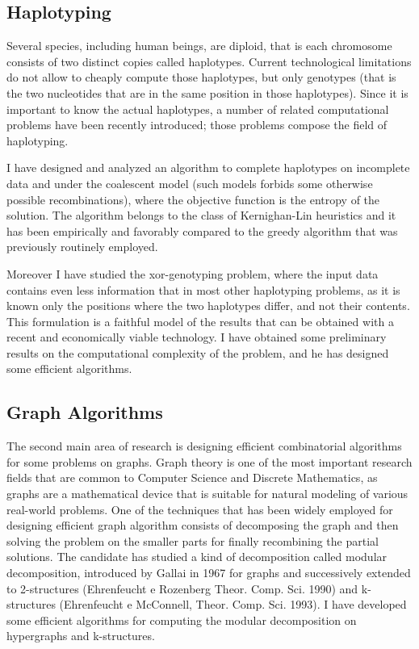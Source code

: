 \documentclass[11pt,a4paper,roman]{moderncv}
\begin{document}
\subsection{Haplotyping}\label{haplotyping}

Several species, including human beings, are diploid, that is each
chromosome consists of two distinct copies called haplotypes. Current
technological limitations do not allow to cheaply compute those
haplotypes, but only genotypes (that is the two nucleotides that are in
the same position in those haplotypes). Since it is important to know
the actual haplotypes, a number of related computational problems have
been recently introduced; those problems compose the field of
haplotyping.

I have designed and analyzed an algorithm to complete haplotypes on
incomplete data and under the coalescent model (such models forbids some
otherwise possible recombinations), where the objective function is the
entropy of the solution. The algorithm belongs to the class of
Kernighan-Lin heuristics and it has been empirically and favorably
compared to the greedy algorithm that was previously routinely employed.

Moreover I have studied the xor-genotyping problem, where the input data
contains even less information that in most other haplotyping problems,
as it is known only the positions where the two haplotypes differ, and
not their contents. This formulation is a faithful model of the results
that can be obtained with a recent and economically viable technology.
I have obtained some preliminary results on the computational complexity
of the problem, and he has designed some efficient algorithms.

\subsection{Graph Algorithms}\label{graph-algorithms}

The second main area of research is designing efficient combinatorial
algorithms for some problems on graphs. Graph theory is one of the most
important research fields that are common to Computer Science and
Discrete Mathematics, as graphs are a mathematical device that is
suitable for natural modeling of various real-world problems. One of the
techniques that has been widely employed for designing efficient graph
algorithm consists of decomposing the graph and then solving the problem
on the smaller parts for finally recombining the partial solutions. The
candidate has studied a kind of decomposition called modular
decomposition, introduced by Gallai in 1967 for graphs and successively
extended to 2-structures (Ehrenfeucht e Rozenberg Theor. Comp. Sci.
1990) and k-structures (Ehrenfeucht e McConnell, Theor. Comp. Sci.
1993). I have developed some efficient algorithms for
computing the modular decomposition on hypergraphs and k-structures.
\end{document}

